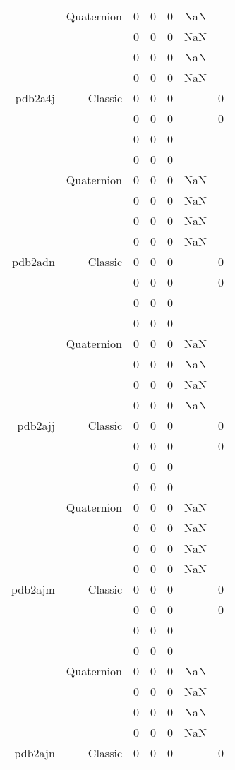 \begin{xltabular}{\textwidth}{r|rcccSc}
& Quaternion & 0 & 0 & 0 & NaN & \\
& & 0 & 0 & 0 & NaN & \\
& & 0 & 0 & 0 & NaN & \\
& & 0 & 0 & 0 & NaN & \\ \addlinespace
pdb2a4j & Classic & 0 & 0 & 0 & & 0 \\
& & 0 & 0 & 0 & & 0 \\
& & 0 & 0 & 0 & & \\
& & 0 & 0 & 0 & & \\
& Quaternion & 0 & 0 & 0 & NaN & \\
& & 0 & 0 & 0 & NaN & \\
& & 0 & 0 & 0 & NaN & \\
& & 0 & 0 & 0 & NaN & \\ \addlinespace
pdb2adn & Classic & 0 & 0 & 0 & & 0 \\
& & 0 & 0 & 0 & & 0 \\
& & 0 & 0 & 0 & & \\
& & 0 & 0 & 0 & & \\
& Quaternion & 0 & 0 & 0 & NaN & \\
& & 0 & 0 & 0 & NaN & \\
& & 0 & 0 & 0 & NaN & \\
& & 0 & 0 & 0 & NaN & \\ \addlinespace
pdb2ajj & Classic & 0 & 0 & 0 & & 0 \\
& & 0 & 0 & 0 & & 0 \\
& & 0 & 0 & 0 & & \\
& & 0 & 0 & 0 & & \\
& Quaternion & 0 & 0 & 0 & NaN & \\
& & 0 & 0 & 0 & NaN & \\
& & 0 & 0 & 0 & NaN & \\
& & 0 & 0 & 0 & NaN & \\ \addlinespace
pdb2ajm & Classic & 0 & 0 & 0 & & 0 \\
& & 0 & 0 & 0 & & 0 \\
& & 0 & 0 & 0 & & \\
& & 0 & 0 & 0 & & \\
& Quaternion & 0 & 0 & 0 & NaN & \\
& & 0 & 0 & 0 & NaN & \\
& & 0 & 0 & 0 & NaN & \\
& & 0 & 0 & 0 & NaN & \\ \addlinespace
pdb2ajn & Classic & 0 & 0 & 0 & & 0 \\

\end{xltabular}
